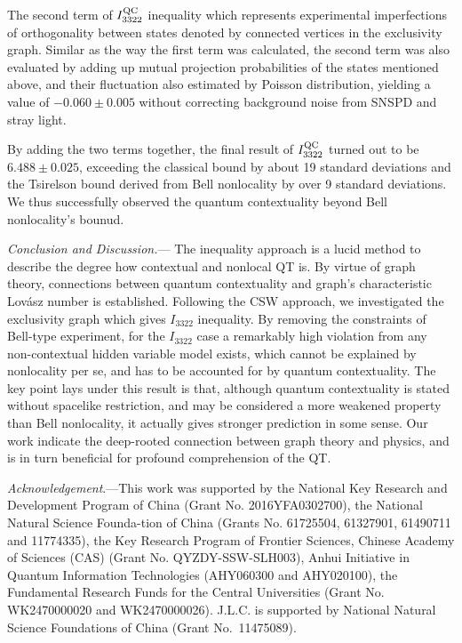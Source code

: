 \documentclass[prl,letterpaper,english,reprint,nofootinbib,aps,superscriptaddress,showpacs,showkeys]{revtex4-1}
\theoremstyle{definition}
\theoremstyle{remark}
\begin{document}
 The second term of $I_{3322}^{\rm QC}$ inequality which represents experimental imperfections of orthogonality between states denoted by connected vertices in the exclusivity graph.
 Similar as the way the first term was calculated, the second term was also evaluated by adding up mutual projection probabilities of the states mentioned above, and their fluctuation also estimated by Poisson distribution, yielding a value of $-0.060 \pm 0.005$ without correcting background noise from SNSPD and stray light.

 By adding the two terms together, the final result of $I_{3322}^{\rm QC}$ turned out to be $6.488 \pm 0.025$, exceeding the classical bound by about 19 standard deviations and the Tsirelson bound derived from Bell nonlocality by over 9 standard deviations. We thus successfully observed the quantum contextuality beyond Bell nonlocality's bounud.

 \emph{Conclusion and Discussion.}--- The inequality approach is a lucid method to describe the degree how contextual and nonlocal QT is. By virtue of graph theory, connections between quantum contextuality and graph's characteristic Lov\'asz number is established.
 Following the CSW approach, we investigated the exclusivity graph which gives $I_{3322}$ inequality. 
 By removing the constraints of Bell-type experiment, for the $I_{3322}$ case a remarkably high violation from any non-contextual hidden variable model exists, which cannot be explained by nonlocality per se, and has to be accounted for by quantum contextuality. 
 The key point lays under this result is that, although quantum contextuality is stated without spacelike restriction, and may be considered a more weakened property than Bell nonlocality, it actually gives stronger prediction in some sense. 
 Our work indicate the deep-rooted connection between graph theory and physics, and is in turn beneficial for profound comprehension of the QT.
 

 \textit{Acknowledgement}.---This work was supported by the National Key Research and Development Program of China (Grant No. 2016YFA0302700), the National Natural Science Founda-tion of China (Grants No. 61725504, 61327901, 61490711 and 11774335), the Key Research Program of Frontier Sciences, Chinese Academy of Sciences (CAS) (Grant No. QYZDY-SSW-SLH003), Anhui Initiative in Quantum Information Technologies (AHY060300 and AHY020100), the Fundamental Research Funds for the Central Universities (Grant No. WK2470000020 and WK2470000026). J.L.C. is supported by National Natural Science Foundations of China (Grant No.\ 11475089).
\end{document}
